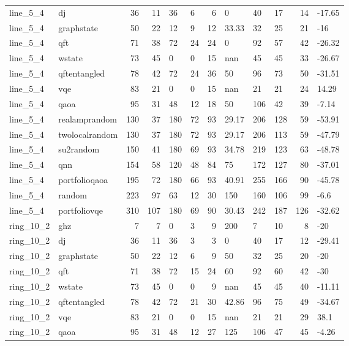 \begin{longtable}{llrrllrlllrl}
line\_5\_4 & dj & 36 & 11 & 36 & 6 & 6 & 0 & 40 & 17 & 14 & -17.65 \\
line\_5\_4 & graphstate & 50 & 22 & 12 & 9 & 12 & 33.33 & 32 & 25 & 21 & -16 \\
line\_5\_4 & qft & 71 & 38 & 72 & 24 & 24 & 0 & 92 & 57 & 42 & -26.32 \\
line\_5\_4 & wstate & 73 & 45 & 0 & 0 & 15 & nan & 45 & 45 & 33 & -26.67 \\
line\_5\_4 & qftentangled & 78 & 42 & 72 & 24 & 36 & 50 & 96 & 73 & 50 & -31.51 \\
line\_5\_4 & vqe & 83 & 21 & 0 & 0 & 15 & nan & 21 & 21 & 24 & 14.29 \\
line\_5\_4 & qaoa & 95 & 31 & 48 & 12 & 18 & 50 & 106 & 42 & 39 & -7.14 \\
line\_5\_4 & realamprandom & 130 & 37 & 180 & 72 & 93 & 29.17 & 206 & 128 & 59 & -53.91 \\
line\_5\_4 & twolocalrandom & 130 & 37 & 180 & 72 & 93 & 29.17 & 206 & 113 & 59 & -47.79 \\
line\_5\_4 & su2random & 150 & 41 & 180 & 69 & 93 & 34.78 & 219 & 123 & 63 & -48.78 \\
line\_5\_4 & qnn & 154 & 58 & 120 & 48 & 84 & 75 & 172 & 127 & 80 & -37.01 \\
line\_5\_4 & portfolioqaoa & 195 & 72 & 180 & 66 & 93 & 40.91 & 255 & 166 & 90 & -45.78 \\
line\_5\_4 & random & 223 & 97 & 63 & 12 & 30 & 150 & 160 & 106 & 99 & -6.6 \\
line\_5\_4 & portfoliovqe & 310 & 107 & 180 & 69 & 90 & 30.43 & 242 & 187 & 126 & -32.62 \\
ring\_10\_2 & ghz & 7 & 7 & 0 & 3 & 9 & 200 & 7 & 10 & 8 & -20 \\
ring\_10\_2 & dj & 36 & 11 & 36 & 3 & 3 & 0 & 40 & 17 & 12 & -29.41 \\
ring\_10\_2 & graphstate & 50 & 22 & 12 & 6 & 9 & 50 & 32 & 25 & 20 & -20 \\
ring\_10\_2 & qft & 71 & 38 & 72 & 15 & 24 & 60 & 92 & 60 & 42 & -30 \\
ring\_10\_2 & wstate & 73 & 45 & 0 & 0 & 9 & nan & 45 & 45 & 40 & -11.11 \\
ring\_10\_2 & qftentangled & 78 & 42 & 72 & 21 & 30 & 42.86 & 96 & 75 & 49 & -34.67 \\
ring\_10\_2 & vqe & 83 & 21 & 0 & 0 & 15 & nan & 21 & 21 & 29 & 38.1 \\
ring\_10\_2 & qaoa & 95 & 31 & 48 & 12 & 27 & 125 & 106 & 47 & 45 & -4.26 \\

\end{longtable}
